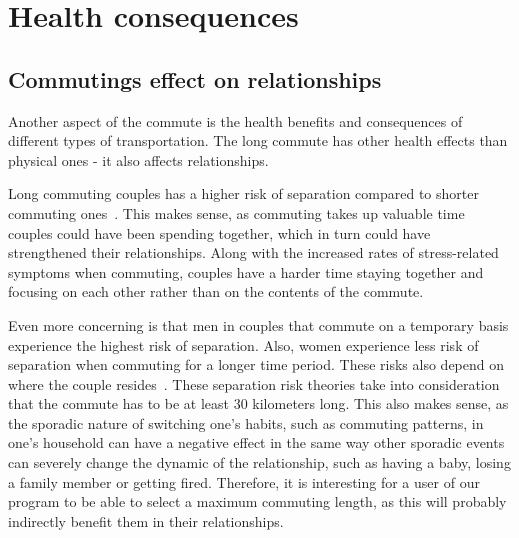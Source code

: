 \section{Health consequences}\label{sec:health-consequences}

\subsection{Commutings effect on relationships}\label{subsec:commutings-effect-on-relationships}

Another aspect of the commute is the health benefits and consequences of different types of transportation.
The long commute has other health effects than physical ones - it also affects relationships.

Long commuting couples has a higher risk of separation compared to shorter commuting ones~\cite{sandow2011}.
This makes sense, as commuting takes up valuable time couples could have been spending together, which in turn could
have strengthened their relationships.
Along with the increased rates of stress-related symptoms when commuting, couples have a harder time staying together
and focusing on each other rather than on the contents of the commute.

Even more concerning is that men in couples that commute on a temporary basis experience the highest risk of separation.
Also, women experience less risk of separation when commuting for a longer time period.
These risks also depend on where the couple resides~\cite{sandow2011}.
These separation risk theories take into consideration that the commute has to be at least 30 kilometers long.
This also makes sense, as the sporadic nature of switching one's habits, such as commuting patterns, in one's household
can have a negative effect in the same way other sporadic events can severely change the dynamic of the relationship,
such as having a baby, losing a family member or getting fired.
Therefore, it is interesting for a user of our program to be able to select a maximum commuting length, as this will
probably indirectly benefit them in their relationships.



